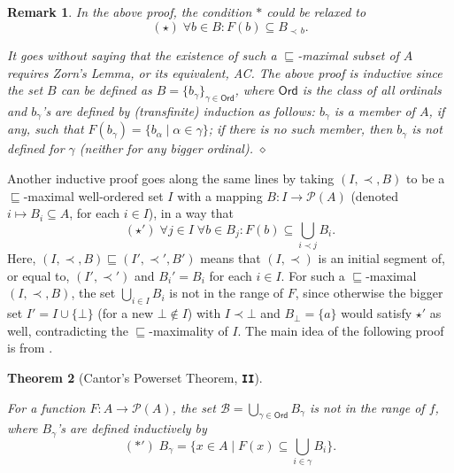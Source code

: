 \documentclass[12pt]{article}
\newtheorem{theorem}{Theorem}[]
\newtheorem{remark}[theorem]{Remark}
\begin{document}
\begin{remark}{\rm
In the above proof, the condition  $\boldsymbol\ast$ could be relaxed to $$(\boldsymbol\star)\; \forall b\in B: F(b)\subseteq B_{\prec\,b}.$$

It goes without saying that the existence of such a $\sqsubseteq$-maximal subset of $A$ requires Zorn's Lemma, or its equivalent, AC. The above proof is inductive since the set $B$ can be defined as $B=\{b_{\gamma}\}_{\gamma\in\textsf{Ord}}$, where $\textsf{Ord}$ is the class of all ordinals and $b_\gamma$'s are defined by (transfinite) induction as follows: $b_\gamma$ is a member of $A$, if any, such that $F(b_\gamma) = \{b_\alpha\mid\alpha\in\gamma\}$; if there is no such member, then $b_\gamma$ is not defined for  $\gamma$ (neither for any bigger ordinal).
\hfill $\diamond$
}\end{remark}





Another inductive proof goes along the same lines by taking $(I,\prec,B)$ to be a $\sqsubseteq$-maximal well-ordered set $I$ with a mapping  $B\colon I\rightarrow\mathscr{P}(A)$ (denoted $i\mapsto B_i\subseteq A$, for each $i\in I$),  in a way that
$$(\boldsymbol\star')\; \forall j\in I\;\forall b\in B_j: F(b)\subseteq\bigcup_{i\prec j}B_i.$$
Here, $(I,\prec,B)\sqsubseteq (I',\prec',B')$ means that $(I,\prec)$ is an initial segment of, or equal to,  $(I',\prec')$ and   $B_i'=B_i$ for each $i\in I$.
For such a $\sqsubseteq$-maximal $(I,\prec,B)$, the set  $\bigcup_{i\in I}B_i$  is not in the range of $F$, since otherwise  the bigger set $I'=I\cup\{\bot\}$ (for a new $\bot\not\in I$) with $I\prec\bot$ and $B_\bot=\{a\}$ would satisfy $\boldsymbol\star'$ as well, contradicting the $\sqsubseteq$-maximality of $I$.
The main idea of the following proof is from \textbf{\cite{V13}}.


\begin{theorem}[Cantor's Powerset Theorem, \texttt{\textbf{II}}]
\,

\noindent
For a function $F\colon A\rightarrow\mathscr{P}(A)$, the set $\mathcal{B}=\bigcup_{\gamma\in\textsf{Ord}}B_\gamma$ is not in the range of $f$, where $B_\gamma$'s are defined inductively by
$$(\boldsymbol\ast')\;B_\gamma=\{x\in A\mid F(x)\subseteq\bigcup_{i\in\gamma}B_i\}.$$
\end{theorem}
\end{document}
